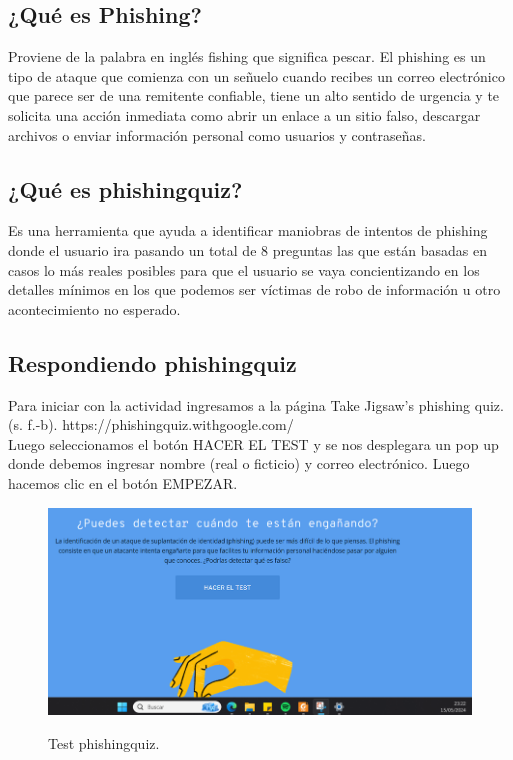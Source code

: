 \documentclass[stu, 11pt, letterpaper, donotrepeattitle, floatsintext, natbib]{apa7}
\begin{document}
\subsection{¿Qué es Phishing?} 
Proviene de la palabra en inglés fishing que significa pescar. El phishing es un tipo de ataque que comienza con un señuelo cuando recibes un correo electrónico que parece ser de una remitente confiable, tiene un alto sentido de urgencia y te solicita una acción inmediata como abrir un enlace a un sitio falso, descargar archivos o enviar información personal como usuarios y contraseñas. 
\noindent {}\\

\subsection{¿Qué es phishingquiz?} 

Es una herramienta que ayuda a identificar maniobras de intentos de phishing donde el usuario ira pasando un total de 8 preguntas las que están basadas en casos lo más reales posibles para que el usuario se vaya concientizando en los detalles mínimos en los que podemos ser víctimas de robo de información u otro acontecimiento no esperado.

\subsection{Respondiendo phishingquiz} 

Para iniciar con la actividad ingresamos a la página Take Jigsaw’s phishing quiz. (s. f.-b). https://phishingquiz.withgoogle.com/  \noindent {}\\  Luego seleccionamos el botón HACER EL TEST y se nos desplegara un pop up donde debemos ingresar nombre (real o ficticio) y correo electrónico. Luego hacemos clic en el botón EMPEZAR.

\begin{figure}[H]
    \centering
    \caption{Test phishingquiz.}
    \includegraphics[width=0.75\linewidth]{phishing1.png} %
    \label{fig:OverallEffect}
\end{figure}
\end{document}
